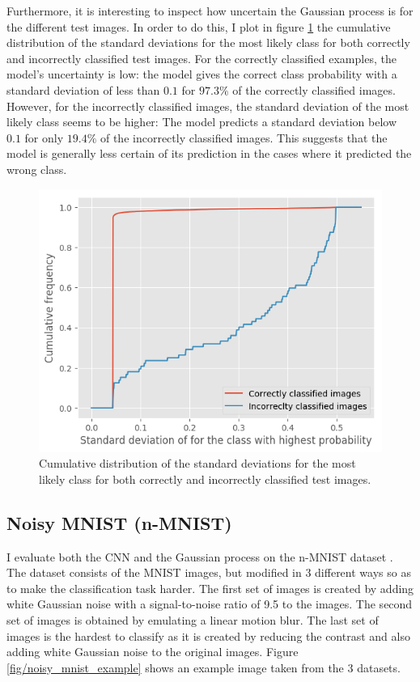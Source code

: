 \documentclass{article}
\begin{document}
Furthermore, it is interesting to inspect how uncertain the Gaussian process is for the different test images. In order to do this, I plot in figure \ref{fig/mnist_cum_stds} the cumulative distribution of the standard deviations for the most likely class for both correctly and incorrectly classified test images. For the correctly classified examples, the model's uncertainty is low: the model gives the correct class probability with a standard deviation of less than $0.1$ for $97.3\%$ of the correctly classified images. However, for the incorrectly classified images, the standard deviation of the most likely class seems to be higher: The model predicts a standard deviation below $0.1$ for only $19.4\%$ of the incorrectly classified images. This suggests that the model is generally less certain of its prediction in the cases where it predicted the wrong class.
\begin{figure}
	\centering
	\includegraphics[scale=0.3]{mnist_cum_stds}
	\caption{Cumulative distribution of the standard deviations for the most likely class for both correctly and incorrectly classified test images.}
	\label{fig/mnist_cum_stds}
\end{figure}

\subsection{Noisy MNIST (n-MNIST)}
I evaluate both the CNN and the Gaussian process on the n-MNIST dataset \cite{DBLP:journals/corr/BasuKGDMN15}. The dataset consists of the MNIST images, but modified in 3 different ways so as to make the classification task harder. The first set of images is created by adding white Gaussian noise with a signal-to-noise ratio of 9.5 to the images. The second set of images is obtained by emulating a linear motion blur. The last set of images is the hardest to classify as it is created by reducing the contrast and also adding white Gaussian noise to the original images. Figure \ref{fig/noisy_mnist_example} shows an example image taken from the 3 datasets.
\end{document}
